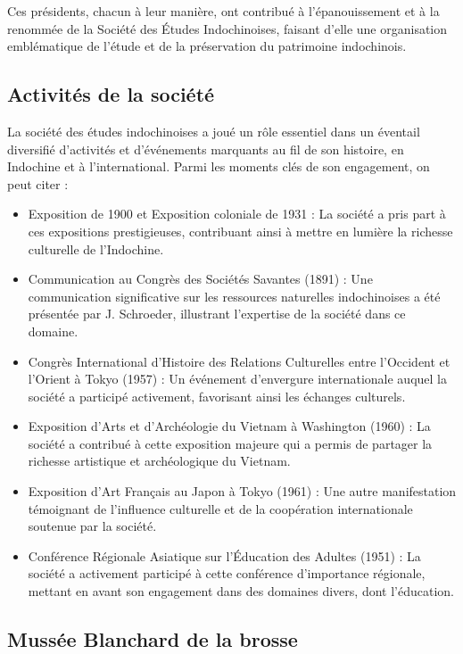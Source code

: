 Ces présidents, chacun à leur manière, ont contribué à l'épanouissement et à la renommée de la Société des Études Indochinoises, faisant d'elle une organisation emblématique de l'étude et de la préservation du patrimoine indochinois.


\subsection{\textbf{Activités de la société
}
}
La société des études indochinoises a joué un rôle essentiel dans un éventail diversifié d'activités et d'événements marquants au fil de son histoire, en Indochine et à l'international. Parmi les moments clés de son engagement, on peut citer :

\begin{itemize}
    \item Exposition de 1900 et Exposition coloniale de 1931 : La société a pris part à ces expositions prestigieuses, contribuant ainsi à mettre en lumière la richesse culturelle de l'Indochine.
    \item Communication au Congrès des Sociétés Savantes (1891) : Une communication significative sur les ressources naturelles indochinoises a été présentée par J. Schroeder, illustrant l'expertise de la société dans ce domaine.
    \item Congrès International d'Histoire des Relations Culturelles entre l'Occident et l'Orient à Tokyo (1957) : Un événement d'envergure internationale auquel la société a participé activement, favorisant ainsi les échanges culturels.
    \item Exposition d'Arts et d'Archéologie du Vietnam à Washington (1960) : La société a contribué à cette exposition majeure qui a permis de partager la richesse artistique et archéologique du Vietnam.
    \item Exposition d'Art Français au Japon à Tokyo (1961) : Une autre manifestation témoignant de l'influence culturelle et de la coopération internationale soutenue par la société.
    \item Conférence Régionale Asiatique sur l'Éducation des Adultes (1951) : La société a activement participé à cette conférence d'importance régionale, mettant en avant son engagement dans des domaines divers, dont l'éducation.
\end{itemize}

\subsection{{Mussée Blanchard de la brosse
}}

